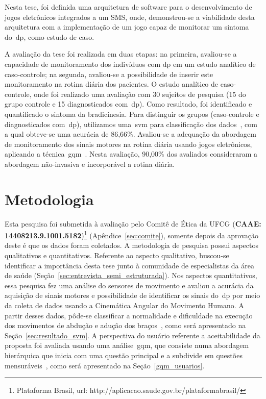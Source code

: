 Nesta tese, foi definida uma arquitetura de software para o desenvolvimento de jogos eletrônicos integrados a um SMS, onde, demonstrou-se a viabilidade desta arquitetura com a implementação de um jogo capaz de monitorar um sintoma do~\ac{dp}, como estudo de caso.


A avaliação da tese foi realizada em duas etapas: na primeira, avaliou-se a capacidade de monitoramento dos indivíduos com \ac{dp} em um estudo analítico de caso-controle; na segunda, avaliou-se a possibilidade de inserir este monitoramento na rotina diária dos pacientes. O estudo analítico de caso-controle, onde foi realizado uma avaliação com 30 sujeitos de pesquisa (15 do grupo controle e 15 diagnosticados com~\ac{dp}). Como resultado, foi identificado e quantificado o sintoma da bradicinesia. Para distinguir os grupos (caso-controle e diagnosticados com~\ac{dp}), utilizamos uma~\ac{svm} para classificação dos dados~\cite{datamining2005}, com a qual obteve-se uma acurácia de 86,66\%. Avaliou-se a adequação da abordagem de monitoramento dos sinais motores na rotina diária usando jogos eletrônicos, aplicando a técnica~\ac{gqm}~\cite{van1999goal}. Nesta avaliação, 90,00\% dos avaliados consideraram a abordagem não-invasiva e incorporável a rotina diária. 



\section{Metodologia}\label{section:metodologia}
Esta pesquisa foi submetida à avaliação pelo Comitê de Ética da UFCG (\textbf{CAAE: 14408213.9.1001.5182})\footnote{Plataforma Brasil, url: http://aplicacao.saude.gov.br/plataformabrasil/} (Apêndice~\ref{sec:comite}), somente depois da aprovação deste é que os dados foram coletados. A metodologia de pesquisa possui aspectos qualitativos e quantitativos. Referente ao aspecto qualitativo, buscou-se identificar a importância desta tese junto à comunidade de especialistas da área de saúde (Seção~\ref{sec:entrevista_semi_estruturada}). Nos aspectos quantitativos, essa pesquisa fez uma análise do sensores de movimento e avaliou a acurácia da aquisição de sinais motores e possibilidade de identificar os sinais do~\ac{dp} por meio da coleta de dados usando a Cinemática Angular do Movimento Humano. A partir desses dados, pôde-se classificar a normalidade e dificuldade na execução dos movimentos de abdução e adução dos braços~\cite{mcginnis2013biomechanics}, como será apresentado na Seção~\ref{sec:resultado_svm}. A perspectiva do usuário referente a aceitabilidade da proposta foi avaliada usando uma análise~\ac{gqm}, que consiste numa abordagem hierárquica que inicia com uma questão principal e a subdivide em questões mensuráveis~\cite{saraiva2006}, como será apresentado na Seção~\ref{gqm_usuarios}.

